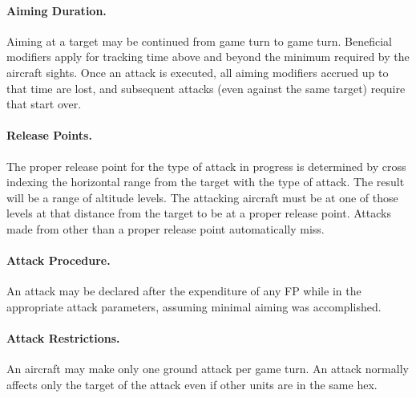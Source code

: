 \paragraph{Aiming Duration.} Aiming at a target may be continued from game turn to game turn. Beneficial modifiers apply for tracking time above and beyond the minimum required by the aircraft sights. Once an attack is executed, all aiming modifiers accrued up to that time are lost, and subsequent attacks (even against the same target) require that start over. 

% 

\paragraph{Release Points.}
\label{rule:release-points} 


The proper release point for the type of attack in progress is determined by cross indexing the horizontal range from the target with the type of attack. The result will be a range of altitude levels. The attacking aircraft must be at one of those levels at that distance from the target to be at a proper release point. Attacks made from other than a proper release point automatically miss.

\paragraph{Attack Procedure.} An attack may be declared after the expenditure of any FP while in the appropriate attack parameters, assuming minimal aiming was accomplished.

\paragraph{Attack Restrictions.} An aircraft may make only one ground attack per game turn. An attack normally affects only the target of the attack even if other units are in the same hex.

